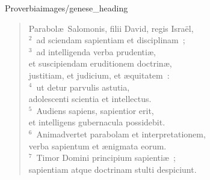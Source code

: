 {Proverbia}{images/genese_heading}

\begin{flushleft}\begin{verse}\vspace{-11pt}Parabol\ae\ Salomonis, filii David, regis Isra\"el,\\
${}^{2}$~ad sciendam sapientiam et disciplinam~;\\
${}^{3}$~ad intelligenda verba prudenti\ae ,\\ et suscipiendam eruditionem doctrin\ae ,\\ justitiam, et judicium, et \ae quitatem~:\\
${}^{4}$~ut detur parvulis astutia,\\ adolescenti scientia et intellectus.\\
${}^{5}$~Audiens sapiens, sapientior erit,\\ et intelligens gubernacula possidebit.\\
${}^{6}$~Animadvertet parabolam et interpretationem,\\ verba sapientum et \ae nigmata eorum.\\
${}^{7}$~Timor Domini principium sapienti\ae~;\\ sapientiam atque doctrinam stulti despiciunt.\end{verse}\end{flushleft}


